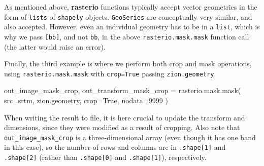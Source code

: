 \documentclass[
  letterpaper,
]{krantz}
\newenvironment{Shaded}{\begin{snugshade}}{\end{snugshade}}
\newcommand{\DecValTok}[1]{\textcolor[rgb]{0.68,0.00,0.00}{#1}}
\newcommand{\NormalTok}[1]{\textcolor[rgb]{0.00,0.23,0.31}{#1}}
\newcommand{\OperatorTok}[1]{\textcolor[rgb]{0.37,0.37,0.37}{#1}}
\newcommand{\VariableTok}[1]{\textcolor[rgb]{0.07,0.07,0.07}{#1}}
\begin{document}
\begin{tcolorbox}[enhanced jigsaw, title=\textcolor{quarto-callout-note-color}{\faInfo}\hspace{0.5em}{Note}, arc=.35mm, toprule=.15mm, titlerule=0mm, colframe=quarto-callout-note-color-frame, breakable, toptitle=1mm, bottomtitle=1mm, rightrule=.15mm, colbacktitle=quarto-callout-note-color!10!white, leftrule=.75mm, left=2mm, bottomrule=.15mm, opacityback=0, coltitle=black, opacitybacktitle=0.6, colback=white]

As mentioned above, \textbf{rasterio} functions typically accept vector
geometries in the form of \texttt{lists} of \texttt{shapely} objects.
\texttt{GeoSeries} are conceptually very similar, and also accepted.
However, even an individual geometry has to be in a \texttt{list}, which
is why we pass \texttt{{[}bb{]}}, and not \texttt{bb}, in the above
\texttt{rasterio.mask.mask} function call (the latter would raise an
error).

\end{tcolorbox}

Finally, the third example is where we perform both crop and mask
operations, using \texttt{rasterio.mask.mask} with \texttt{crop=True}
passing \texttt{zion.geometry}.

\begin{Shaded}
\begin{Highlighting}[]
\NormalTok{out\_image\_mask\_crop, out\_transform\_mask\_crop }\OperatorTok{=}\NormalTok{ rasterio.mask.mask(}
\NormalTok{    src\_srtm, }
\NormalTok{    zion.geometry, }
\NormalTok{    crop}\OperatorTok{=}\VariableTok{True}\NormalTok{, }
\NormalTok{    nodata}\OperatorTok{=}\DecValTok{9999}
\NormalTok{)}
\end{Highlighting}
\end{Shaded}

When writing the result to file, it is here crucial to update the
transform and dimensions, since they were modified as a result of
cropping. Also note that \texttt{out\_image\_mask\_crop} is a
three-dimensional array (even though it has one band in this case), so
the number of rows and columns are in \texttt{.shape{[}1{]}} and
\texttt{.shape{[}2{]}} (rather than \texttt{.shape{[}0{]}} and
\texttt{.shape{[}1{]}}), respectively.
\end{document}
